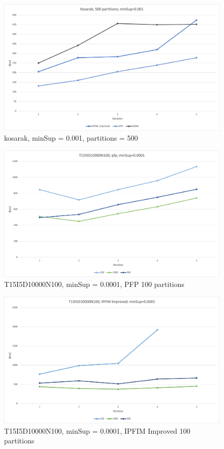 \begin{figure}
  \centering
  \includegraphics[width=\linewidth]{figures/4iterations/kosarak_500part_001}
  \caption{kosarak, minSup = 0.001,  partitions = 500}
  \label{fig:kosarak_500part_001}
\end{figure}

\begin{figure}
  \centering
  \includegraphics[width=\linewidth]{figures/4iterations/T15I5D10000N100_pfp_0001}
  \caption{T15I5D10000N100, minSup = 0.0001,  PFP 100 partitions}
  \label{fig:T15I5D10000N100_pfp_0001}
\end{figure}


\begin{figure}
  \centering
  \includegraphics[width=\linewidth]{figures/4iterations/T15I5D10000N100_ipfim_imp_0001}
  \caption{T15I5D10000N100, minSup = 0.0001,  IPFIM Improved 100 partitions}
  \label{fig:T15I5D10000N100_ipfim_imp_0001}
\end{figure}

